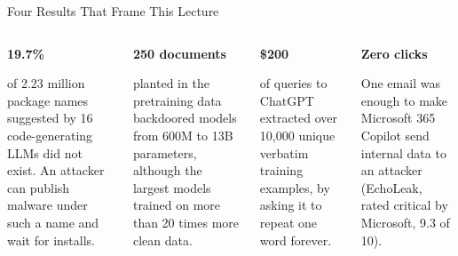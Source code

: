 \begin{frame}{Four Results That Frame This Lecture}
  \begin{columns}[T,onlytextwidth]
      \begin{tcolorbox}[colframe=KAred, colback=gray!6, boxrule=0.5pt, left=5pt, right=5pt, top=4pt, bottom=4pt]
        {\large\textbf{19.7\%}}\par\vspace{0.1em}
        {\footnotesize\raggedright of 2.23 million package names suggested by 16 code-generating LLMs did not exist. An attacker can publish malware under such a name and wait for installs.\par}
      \end{tcolorbox}
      \vspace{0.15em}
      \begin{tcolorbox}[colframe=KAred, colback=gray!6, boxrule=0.5pt, left=5pt, right=5pt, top=4pt, bottom=4pt]
        {\large\textbf{250 documents}}\par\vspace{0.1em}
        {\footnotesize\raggedright planted in the pretraining data backdoored models from 600M to 13B parameters, although the largest models trained on more than 20 times more clean data.\par}
      \end{tcolorbox}
      \begin{tcolorbox}[colframe=KAred, colback=gray!6, boxrule=0.5pt, left=5pt, right=5pt, top=4pt, bottom=4pt]
        {\large\textbf{\$200}}\par\vspace{0.1em}
        {\footnotesize\raggedright of queries to ChatGPT extracted over 10,000 unique verbatim training examples, by asking it to repeat one word forever.\par}
      \end{tcolorbox}
      \vspace{0.15em}
      \begin{tcolorbox}[colframe=KAred, colback=gray!6, boxrule=0.5pt, left=5pt, right=5pt, top=4pt, bottom=4pt]
        {\large\textbf{Zero clicks}}\par\vspace{0.1em}
        {\footnotesize\raggedright One email was enough to make Microsoft 365 Copilot send internal data to an attacker (EchoLeak, rated critical by Microsoft, 9.3 of 10).\par}
      \end{tcolorbox}

\end{columns}
\end{frame}
